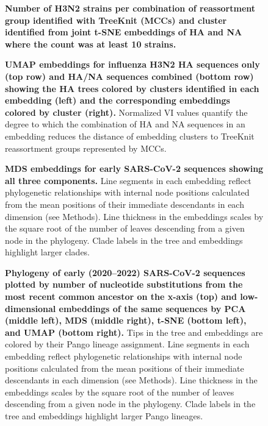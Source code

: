 \documentclass[webpdf,contemporary,large,single]{oup-authoring-template}%
\theoremstyle{thmstyleone}%
\theoremstyle{thmstyletwo}%
\theoremstyle{thmstylethree}%
\begin{document}
\begin{figure}[H]
\caption{{\bf Number of H3N2 strains per combination of reassortment group identified with TreeKnit (MCCs) and cluster identified from joint t-SNE embeddings of HA and NA where the count was at least 10 strains.}}\label{S_Fig_flu_ha_na_tsne_mcc_counts}
\end{figure}

\begin{figure}[H]
\caption{{\bf UMAP embeddings for influenza H3N2 HA sequences only (top row) and HA/NA sequences combined (bottom row) showing the HA trees colored by clusters identified in each embedding (left) and the corresponding embeddings colored by cluster (right).}
  Normalized VI values quantify the degree to which the combination of HA and NA sequences in an embedding reduces the distance of embedding clusters to TreeKnit reassortment groups represented by MCCs.}\label{S_Fig_flu_ha_na_umap_embeddings}
\end{figure}

\begin{figure}[H]
\caption{{\bf MDS embeddings for early SARS-CoV-2 sequences showing all three components.}
  Line segments in each embedding reflect phylogenetic relationships with internal node positions calculated from the mean positions of their immediate descendants in each dimension (see Methods).
  Line thickness in the embeddings scales by the square root of the number of leaves descending from a given node in the phylogeny.
  Clade labels in the tree and embeddings highlight larger clades.}\label{S_Fig_sarscov2_early_mds}
\end{figure}

\begin{figure}[H]
\caption{{\bf Phylogeny of early (2020--2022) SARS-CoV-2 sequences plotted by number of nucleotide substitutions from the most recent common ancestor on the x-axis (top) and low-dimensional embeddings of the same sequences by PCA (middle left), MDS (middle right), t-SNE (bottom left), and UMAP (bottom right).}
  Tips in the tree and embeddings are colored by their Pango lineage assignment.
  Line segments in each embedding reflect phylogenetic relationships with internal node positions calculated from the mean positions of their immediate descendants in each dimension (see Methods).
  Line thickness in the embeddings scales by the square root of the number of leaves descending from a given node in the phylogeny.
  Clade labels in the tree and embeddings highlight larger Pango lineages.
}\label{S_Fig_sarscov2_early_embeddings_by_Nextclade_pango}
\end{figure}
\end{document}
